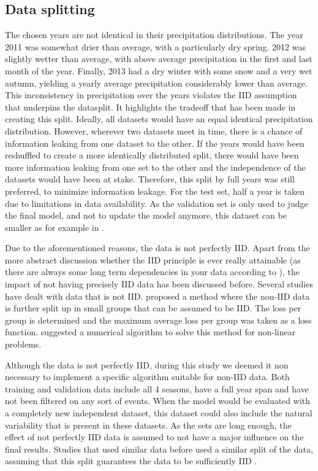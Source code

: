 \documentclass[twocolumn, 10pt, a4paper]{memoir}
\begin{document}
	\subsection{Data splitting} \label{sec: datasplitting}
	The chosen years are not identical in their precipitation distributions. The year 2011 was somewhat drier than average, with a particularly dry spring. 2012 was slightly wetter than average, with above average precipitation in the first and last month of the year. Finally, 2013 had a dry winter with some snow and a very wet autumn, yielding a yearly average precipitation considerably lower than average. \cite{KNMI}  
	This inconsistency in precipitation over the years violates the IID assumption that underpins the datasplit. It highlights the tradeoff that has been made in creating this split. Ideally, all datasets would have an equal identical precipitation distribution. However, wherever two datasets meet in time, there is a chance of information leaking from one dataset to the other. If the years would have been reshuffled to create a more identically distributed split, there would have been more information leaking from one set to the other and the independence of the datasets would have been at stake. Therefore, this split by full years was still preferred, to minimize information leakage. For the test set, half a year is taken due to limitations in data availability. As the validation set is only used to judge the final model, and not to update the model anymore, this dataset can be smaller as for example in .
	
	Due to the aforementioned reasons, the data is not perfectly IID. Apart from the more abstract discussion whether the IID principle is ever really attainable (as there are always some long term dependencies in your data according to ), the impact of not having precisely IID data has been discussed before. Several studies have dealt with data that is not IID.  proposed a method where the non-IID data is further split up in small groups that can be assumed to be IID. The loss per group is determined and the maximum average loss per group was taken as a loss function.  suggested a numerical algorithm to solve this method for non-linear problems.
	
	Although the data is not perfectly IID, during this study we deemed it non necessary to implement a specific algorithm suitable for non-IID data. Both training and validation data include all 4 seasons, have a full year span and have not been filtered on any sort of events. When the model would be evaluated with a completely new independent dataset, this dataset could also include the natural variability that is present in these datasets. As the sets are long enough, the effect of not perfectly IID data is assumed to not have a major influence on the final results. Studies that used similar data before used a similar split of the data, assuming that this split guarantees the data to be sufficiently IID \cite{Diba2021,Pudashine2020}.
	
\end{document}
